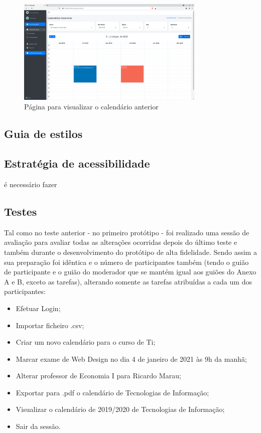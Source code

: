 \documentclass[11pt, twoside]{report}
\begin{document}
	\begin{figure}[H] 
		\centering 							\includegraphics[width=0.8\textwidth,height=0.8\textheight,keepaspectratio]{image/PrototipoAFNF/calendarioAnterior}
		\caption{Página para visualizar o calendário anterior }
		\label{calendarioAnterior}
	\end{figure}

	\subsection{Guia de estilos}
	\subsection{Estratégia de acessibilidade}
	é necessário fazer
	\subsection{Testes}
	
	Tal como no teste anterior - no primeiro protótipo - foi realizado uma sessão de avaliação para avaliar todas as alterações ocorridas depois do último teste e também durante o desenvolvimento do protótipo de alta fidelidade. Sendo assim a sua preparação foi idêntica e o número de participantes também (tendo o guião de participante e o guião do moderador que se mantém igual aos guiões do Anexo A e B, exceto as tarefas), alterando somente as tarefas atribuídas a cada um dos participantes: 
	
	\begin{itemize}
		\item Efetuar Login;
		\item Importar ficheiro .csv;
		\item Criar um novo calendário para o curso de Ti;
		\item Marcar exame de Web Design no dia 4 de janeiro de 2021 às 9h da manhã;
		\item Alterar professor de Economia I para Ricardo Marau;
		\item Exportar para .pdf o calendário de Tecnologias de Informação;
		\item Visualizar o calendário de 2019/2020 de Tecnologias de Informação;
		\item Sair da sessão.
		
	\end{itemize}
	
\end{document}
